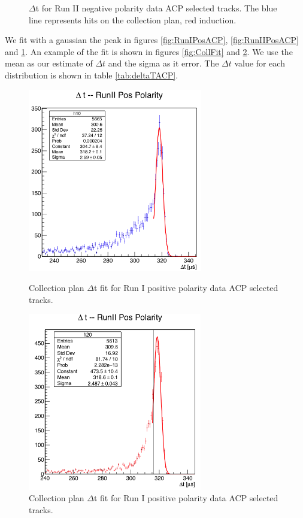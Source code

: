 \begin{figure}[b]
\begin{minipage}{0.45\textwidth}
\caption{$\Delta$t for Run II negative polarity data ACP selected tracks.  The blue line represents hits on the collection plan, red induction.}
\label{fig:RunIINegACP}
\end{minipage}
\end{figure}

We fit with a gaussian the peak in figures  \ref{fig:RunIPosACP}, \ref{fig:RunIIPosACP} and \ref{fig:RunIINegACP}. An example of the fit is shown in figures \ref{fig:CollFit} and \ref{fig:IndFit}. We use the mean as our estimate of $\Delta t$ and the sigma as it error. The $\Delta t$ value for each distribution is shown in table \ref{tab:deltaTACP}.
\begin{figure}[b]
\centering
\begin{minipage}{0.45\textwidth}
\centering
\includegraphics[width=3in]{images/CollectionFitRunIIPos.png}
\caption{Collection plan $\Delta$t fit  for Run I positive polarity data ACP selected tracks. }
\label{fig:CollFit}
\end{minipage}\hfill
\begin{minipage}{0.45\textwidth}
\centering
\includegraphics[width=3in]{images/InductionFitRunIIPos.png}
\caption{Collection plan $\Delta$t fit  for Run I positive polarity data ACP selected tracks. }
\label{fig:IndFit}
\end{minipage}
\end{figure}

